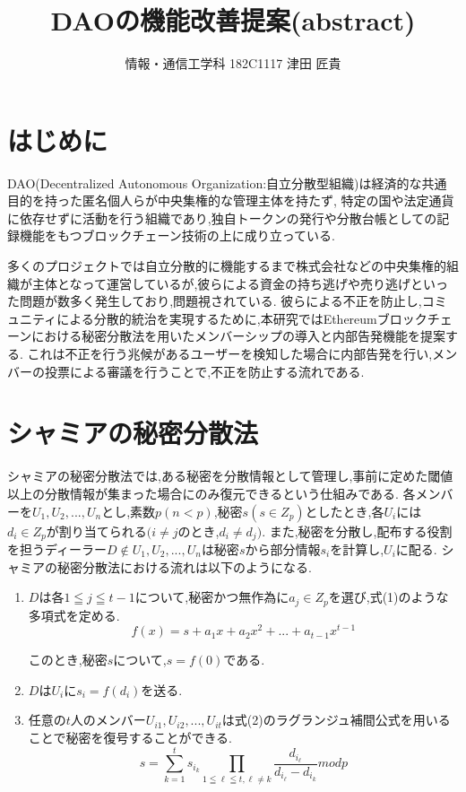 \documentclass[twocolumn,a4j]{jarticle}
\title{DAOの機能改善提案(abstract)}
\author{情報・通信工学科 182C1117 津田 匠貴}
\begin{document}
\maketitle
\section{はじめに}
DAO(Decentralized Autonomous Organization:自立分散型組織)は経済的な共通目的を持った匿名個人らが中央集権的な管理主体を持たず,
特定の国や法定通貨に依存せずに活動を行う組織であり,独自トークンの発行や分散台帳としての記録機能をもつブロックチェーン技術の上に成り立っている.

多くのプロジェクトでは自立分散的に機能するまで株式会社などの中央集権的組織が主体となって運営しているが,彼らによる資金の持ち逃げや売り逃げといった問題が数多く発生しており,問題視されている.
彼らによる不正を防止し,コミュニティによる分散的統治を実現するために,本研究ではEthereumブロックチェーンにおける秘密分散法を用いたメンバーシップの導入と内部告発機能を提案する.
これは不正を行う兆候があるユーザーを検知した場合に内部告発を行い,メンバーの投票による審議を行うことで,不正を防止する流れである.

\section{シャミアの秘密分散法}
シャミアの秘密分散法では,ある秘密を分散情報として管理し,事前に定めた閾値以上の分散情報が集まった場合にのみ復元できるという仕組みである.
各メンバーを$U_1,U_2,...,U_n$とし,素数$p(n<p)$,秘密$s(s∈Z_p)$としたとき,各$U_i$には$d_i∈Z_p$が割り当てられる$(i≠j$のとき,$d_i≠d_j)$.
また,秘密を分散し,配布する役割を担うディーラー$D\notin{{U_1,U_2,...,U_n}}$は秘密$s$から部分情報$s_i$を計算し,$U_i$に配る.
シャミアの秘密分散法における流れは以下のようになる.
\begin{enumerate}
  \item $D$は各$1≦j≦t-1$について,秘密かつ無作為に$a_j∈Z_p$を選び,式(1)のような多項式を定める.
        \begin{equation}
          f(x)=s+a_1x+a_2x^2+...+a_{t-1}x^{t-1}
        \end{equation}

        このとき,秘密$s$について,$s=f(0)$である.
  \item $D$は$U_i$に$s_i=f(d_i)$を送る.
  \item 任意の$t$人のメンバー$U_{i1},U_{i2},...,U_{it}$は式(2)のラグランジュ補間公式を用いることで秘密を復号することができる.
        \begin{equation}
          s=\sum^t_{{k=1}}s_{i_k}\prod_{1≦\ell≦t,\ell≠k}\frac{d_{i_\ell}}{d_{i_\ell}-d_{i_k}}mod p
        \end{equation}

\end{enumerate}
\end{document}

